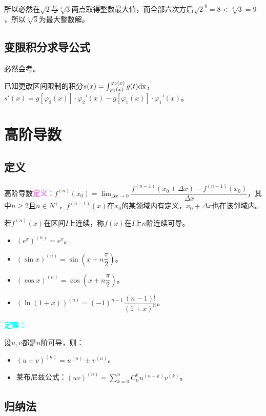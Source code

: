 \documentclass[UTF8, 12pt]{ctexart}
\begin{document}
所以必然在$\sqrt{2}$与$\sqrt[3]{3}$两点取得整数最大值，而全部六次方后$\sqrt{2}^6=8<\sqrt[3]{3}=9$，所以$\sqrt[3]{3}$为最大整数解。

\subsection{变限积分求导公式}

必然会考。

已知更改区间限制的积分$s(x)=\int_{\varphi_1(x)}^{\varphi_2(x)}g(t)\rm{d}x$，$s'(x)=g[\varphi_2(x)]\cdot\varphi_2'(x)-g[\varphi_1(x)]\cdot\varphi_1'(x)$。

\section{高阶导数}

\subsection{定义}

高阶导数\textcolor{violet}{\textbf{定义：}}$f^{(n)}(x_0)=\lim_{\Delta x\to 0}\dfrac{f^{(n-1)}(x_0+\Delta x)-f^{(n-1)}(x_0)}{\Delta x}$，其中$n\geqslant 2$且$n\in N^+$，$f^{(n-1)}(x)$在$x_0$的某领域内有定义，$x_0+\Delta x$也在该邻域内。

若$f^{(n)}(x)$在区间$I$上连续，称$f(x)$在$I$上$n$阶连续可导。

\begin{itemize}
    \item $(e^x)^{(n)}=e^x$。
    \item $(\sin x)^{(n)}=\sin(x+n\dfrac{\pi}{2})$。
    \item $(\cos x)^{(n)}=\cos(x+n\dfrac{\pi}{2})$。
    \item $(\ln(1+x))^{(n)}=(-1)^{n-1}\dfrac{(n-1)!}{(1+x)^n}$。
\end{itemize}

\textcolor{aqua}{\textbf{定理：}}

设$u,v$都是$n$阶可导，则：

\begin{itemize}
    \item $(u\pm v)^{(n)}=u^{(n)}\pm v^{(n)}$。
    \item 莱布尼兹公式：$(uv)^{(n)}=\sum_{k=0}^nC_n^ku^{(n-k)}v^{(k)}$。
\end{itemize}

\subsection{归纳法}
\end{document}
